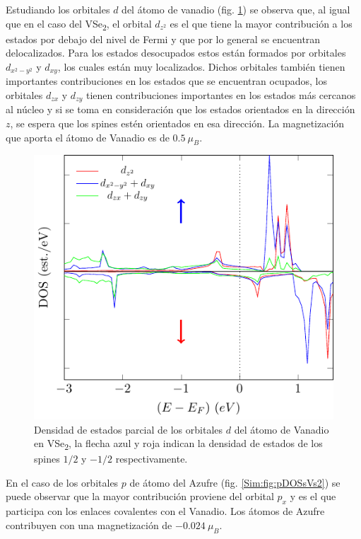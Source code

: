 \par Estudiando los orbitales $d$ del \'atomo de vanadio (fig. \ref{Sim:fig:pDOSvVs2}) se observa que, al igual que en el caso del VSe\textsubscript{2},  el orbital $d_{z^2}$ es el que tiene la mayor contribución a los  estados por debajo del nivel de Fermi y que por lo general se encuentran delocalizados. Para los estados  desocupados estos est\'an formados por orbitales $d_{x^2-y^2}$ y $d_{xy}$, los cuales est\'an muy localizados. Dichos orbitales tambi\'en tienen importantes contribuciones en los estados que se encuentran ocupados, los orbitales $d_{zx}$ y $d_{zy}$ tienen contribuciones importantes en los estados m\'as cercanos al n\'ucleo y si se toma en consideraci\'on que los estados orientados en la direcci\'on $z$, se espera que los spines est\'en orientados en esa direcci\'on. La magnetizaci\'on que aporta el \'atomo de Vanadio es de $ 0.5 ~\mu_{B} $.
\begin{figure}[!hbt]
	\centering
	\includegraphics[scale=1]{figRes/VSe2/bandas/celU/nosoc/pdosV.pdf}
	\caption[Densidad de estados proyectada de los orbitales $d$ del Vanadio en el VS\textsubscript{2}.]{Densidad de estados parcial de los orbitales $d$ del \'atomo de Vanadio en VSe\textsubscript{2}, la flecha azul y roja indican la densidad de estados de los spines $1/2$ y $-1/2$ respectivamente.}
	\label{Sim:fig:pDOSvVs2}
\end{figure}
En el caso de los orbitales $p$ de \'atomo del Azufre (fig. \ref{Sim:fig:pDOSsVs2}) se puede observar que la mayor contribuci\'on proviene del  orbital $p_x$ y es el que participa con los enlaces covalentes con el Vanadio. Los \'atomos de Azufre contribuyen con una magnetizaci\'on de $-0.024 ~\mu_{B} $. 
\newline

